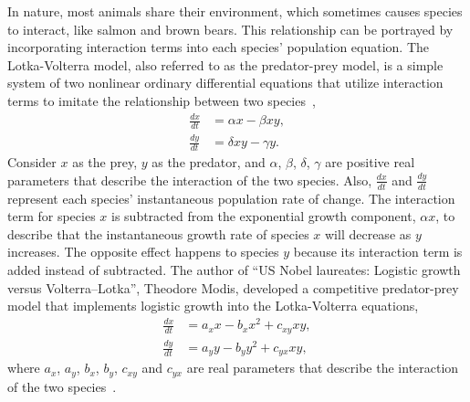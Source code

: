 In nature, most animals share their environment, which sometimes causes species to interact, like salmon and brown bears. 
This relationship can be portrayed by incorporating interaction terms into each species' population equation.
The Lotka-Volterra model, also referred to as the predator-prey model, is a simple system of two nonlinear ordinary differential equations that utilize interaction terms to imitate the relationship between two species~\cite{anisiu2014lotka},
\begin{equation}\label{eq:lotkavoltera}
    \begin{aligned}
        \frac{dx}{dt} & = \alpha x - \beta xy,\\
        \frac{dy}{dt} & = \delta xy - \gamma y.
    \end{aligned}
\end{equation}
Consider $x$ as the prey, $y$ as the predator, and $\alpha$, $\beta$, $\delta$, $\gamma$ are positive real parameters that describe the interaction of the two species. 
Also, $\displaystyle \frac{dx}{dt}$ and $\displaystyle \frac{dy}{dt}$ represent each species' instantaneous population rate of change. 
The interaction term for species $x$ is subtracted from the exponential growth component, $\alpha x$, to describe that the instantaneous growth rate of species $x$ will decrease as $y$ increases. The opposite effect happens to species $y$ because its interaction term is added instead of subtracted.
The author of ``US Nobel laureates: Logistic growth versus Volterra–Lotka'', Theodore Modis, developed a competitive predator-prey model that implements logistic growth into the Lotka-Volterra equations,
\begin{equation}\label{eq:modislotkavoltera}
    \begin{aligned}
    \frac{dx}{dt} &= a_xx - b_xx^2 + c_{xy}xy,\\
    \frac{dy}{dt} &= a_yy - b_yy^2 + c_{yx}xy,
    \end{aligned}
\end{equation}
where $a_{x}$, $a_{y}$, $b_{x}$, $b_{y}$, $c_{xy}$ and $c_{yx}$ are real parameters that describe the interaction of the two species~\cite{modis2011us}.






